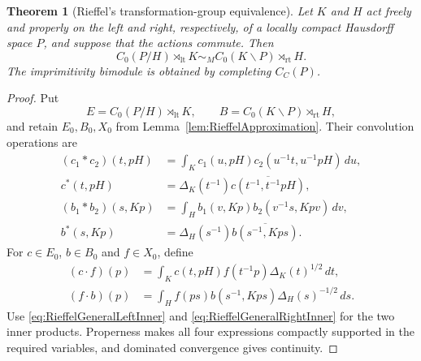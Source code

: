 \documentclass{book}
\newtheorem{theorem}[definition]{Theorem}
\begin{document}
\begin{theorem}[Rieffel's transformation-group equivalence]
  \label{thm:RieffelTransformationEquivalence}
  Let \(K\) and \(H\) act freely and properly on the left and right,
  respectively, of a locally compact Hausdorff space \(P\), and suppose that
  the actions commute. Then
  \[
    C_0(P/H)\rtimes_{\operatorname{lt}}K
      \sim_M
    C_0(K\backslash P)\rtimes_{\operatorname{rt}}H.
  \]
  The imprimitivity bimodule is obtained by completing \(C_C(P)\).
\end{theorem}

\begin{proof}
  Put
  \[
    E=C_0(P/H)\rtimes_{\operatorname{lt}}K,
    \qquad
    B=C_0(K\backslash P)\rtimes_{\operatorname{rt}}H,
  \]
  and retain \(E_0,B_0,X_0\) from
  Lemma~\ref{lem:RieffelApproximation}.  Their convolution operations are
  \begin{align*}
    (c_1*c_2)(t,pH)
      &=\int_Kc_1(u,pH)c_2(u^{-1}t,u^{-1}pH)\,du,\\
    c^*(t,pH)
      &=\Delta_K(t^{-1})\overline{c(t^{-1},t^{-1}pH)},\\
    (b_1*b_2)(s,Kp)
      &=\int_Hb_1(v,Kp)b_2(v^{-1}s,Kpv)\,dv,\\
    b^*(s,Kp)
      &=\Delta_H(s^{-1})\overline{b(s^{-1},Kps)}.
  \end{align*}
  For \(c\in E_0\), \(b\in B_0\) and \(f\in X_0\), define
  \begin{align}
    (c\cdot f)(p)
      &=\int_Kc(t,pH)f(t^{-1}p)\Delta_K(t)^{1/2}\,dt,
      \label{eq:RieffelGeneralLeftAction}\\
    (f\cdot b)(p)
      &=\int_Hf(ps)b(s^{-1},Kps)\Delta_H(s)^{-1/2}\,ds.
      \label{eq:RieffelGeneralRightAction}
  \end{align}
  Use \eqref{eq:RieffelGeneralLeftInner} and
  \eqref{eq:RieffelGeneralRightInner} for the two inner products.
  Properness makes all four expressions compactly supported in the required
  variables, and dominated convergence gives continuity.


\end{proof}
\end{document}
